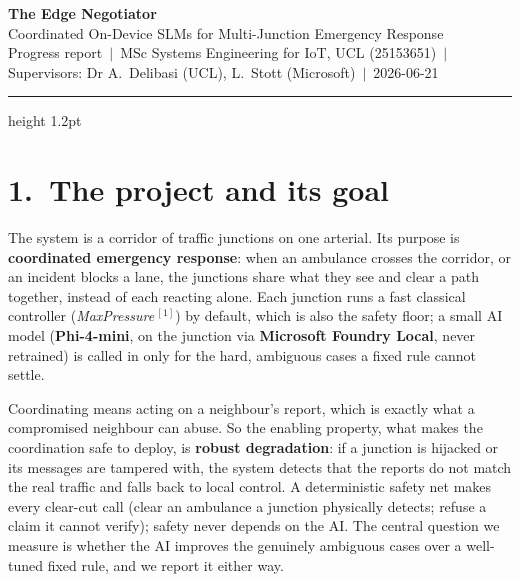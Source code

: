 \documentclass[11pt]{article}
\begin{document}
\begin{center}
{\sffamily\bfseries\LARGE\color{nbblue} The Edge Negotiator}\\[3pt]
{\sffamily\large Coordinated On-Device SLMs for Multi-Junction Emergency Response}\\[5pt]
{\footnotesize\color{nbgrey} Progress report \,$\vert$\, MSc Systems Engineering for IoT, UCL (25153651) \,$\vert$\, Supervisors: Dr A.\ Delibasi (UCL), L.\ Stott (Microsoft) \,$\vert$\, 2026-06-21}
\end{center}
\vspace{2pt}
{\color{nbblue}\hrule height 1.2pt}
\vspace{8pt}

\section{1.\ The project and its goal}
The system is a corridor of traffic junctions on one arterial. Its purpose is \textbf{coordinated emergency response}: when an ambulance crosses the corridor, or an incident blocks a lane, the junctions share what they see and clear a path together, instead of each reacting alone. Each junction runs a fast classical controller (\emph{MaxPressure}\,$^{[1]}$) by default, which is also the safety floor; a small AI model (\textbf{Phi-4-mini}, on the junction via \textbf{Microsoft Foundry Local}, never retrained) is called in only for the hard, ambiguous cases a fixed rule cannot settle.

Coordinating means acting on a neighbour's report, which is exactly what a compromised neighbour can abuse. So the enabling property, what makes the coordination safe to deploy, is \textbf{robust degradation}: if a junction is hijacked or its messages are tampered with, the system detects that the reports do not match the real traffic and falls back to local control. A deterministic safety net makes every clear-cut call (clear an ambulance a junction physically detects; refuse a claim it cannot verify); safety never depends on the AI. The central question we measure is whether the AI improves the genuinely ambiguous cases over a well-tuned fixed rule, and we report it either way.
\end{document}
